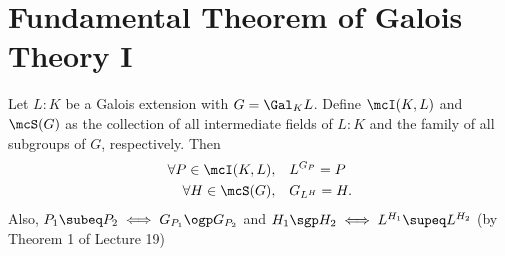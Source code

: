 \documentclass[a4paper]{article}
\begin{document}
\section{Fundamental Theorem of Galois Theory I}
\begin{ttheorem}
  Let \( L:K \) be a Galois extension with \( G=\Gal_K L \).
  Define \( \mcI(K,L) \) and \( \mcS(G) \) as the collection of all intermediate fields of \(L:K\) and the family of all subgroups of \( G \), respectively.
  Then \begin{align*}
    \forall P\in \mcI(K,L), \quad &L^{G_P} = P \\
    \forall H\in \mcS(G), \quad &G_{L^H} = H.
  \end{align*}
  Also, \( P_1\subeq P_2 \iff G_{P_1}\ogp G_{P_2} \) and \( H_1 \sgp H_2 \iff L^{H_1}\supeq L^{H_2} \) (by Theorem 1 of Lecture 19)
\end{ttheorem}







\end{document}
